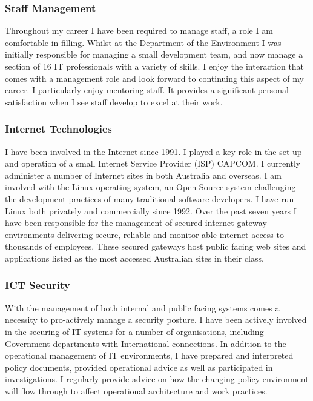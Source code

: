 \documentclass[]{friggeri-cv} %
\begin{document}
\subsubsection*{Staff Management}
Throughout my career I have been required to manage staff, a role I am comfortable in filling. Whilst at the Department of the Environment I was initially responsible for managing a small development team, and now manage a section of 16 IT professionals with a variety of skills.  I enjoy the interaction that comes with a management role and look forward to continuing this aspect of my career.  I particularly enjoy mentoring staff. It provides a significant personal satisfaction when I see staff develop to excel at their work.

\subsubsection*{Internet Technologies}
I have been involved in the Internet since 1991. I played a key role in the set up and operation of a small Internet Service Provider (ISP) CAPCOM. I currently administer a number of Internet sites in both Australia and overseas. I am involved with the Linux operating system, an Open Source system challenging the development practices of many traditional software developers. I have run Linux both privately and commercially since 1992. Over the past seven years I have been responsible for the management of secured internet gateway environments delivering secure, reliable and monitor-able internet access to thousands of employees. These secured gateways host public facing web sites and applications listed as the most accessed Australian sites in their class.

\subsubsection*{ICT Security}
With the management of both internal and public facing systems comes a necessity to pro-actively manage a security posture. I have been actively involved in the securing of IT systems for a number of organisations, including Government departments with International connections. In addition to the operational management of IT environments, I have prepared and interpreted policy documents, provided operational advice as well as participated in investigations. I regularly provide advice on how the changing policy environment will flow through to affect operational architecture and work practices.
\end{document}
